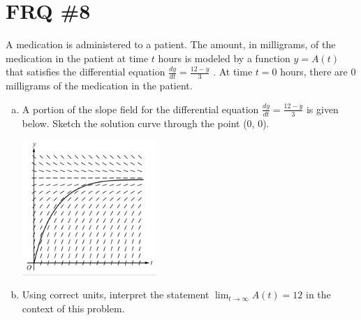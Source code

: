 \documentclass[11pt,letterpaper]{article}
\begin{document}
\section*{FRQ \#8}
A medication is administered to a patient. The amount, in milligrams, of the medication in the patient at time $t$ hours is modeled by a function $y=A(t)$ that satisfies the differential equation $\frac{dy}{dt}=\frac{12-y}{3}$ . At time $t = 0$ hours, there are $0$ milligrams of the medication in the patient.
\begin{enumerate}[a.)]
    \item A portion of the slope field for the differential equation $\frac{dy}{dt}=\frac{12-y}{3}$ is given below. Sketch the solution curve through the point (0, 0).
    \begin{center}
        \includegraphics[width=2in]{Slope.png}
    \end{center}
    \item Using correct units, interpret the statement $\lim_{t\to\infty} A(t)=12
$ in the context of this problem.


\end{enumerate}
\end{document}
